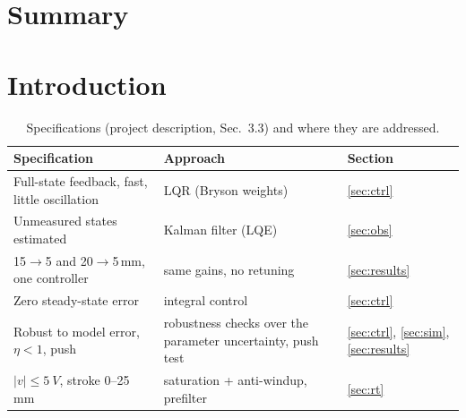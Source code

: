 \section*{Summary}

\section{Introduction}

\begin{table}[H]\centering
\caption{Specifications (project description, Sec.~3.3) and where they are addressed.}
\begin{tabular}{lll}\toprule
Specification & Approach & Section\\\midrule
Full-state feedback, fast, little oscillation & LQR (Bryson weights) & \ref{sec:ctrl}\\
Unmeasured states estimated & Kalman filter (LQE) & \ref{sec:obs}\\
15$\to$5 and 20$\to$5\,mm, one controller & same gains, no retuning & \ref{sec:results}\\
Zero steady-state error & integral control & \ref{sec:ctrl}\\
Robust to model error, $\eta<1$, push & robustness checks over the parameter uncertainty, push test & \ref{sec:ctrl}, \ref{sec:sim}, \ref{sec:results}\\
$|v|\le\SI{5}{V}$, stroke 0--25\,mm & saturation + anti-windup, prefilter & \ref{sec:rt}\\\bottomrule
\end{tabular}\end{table}

